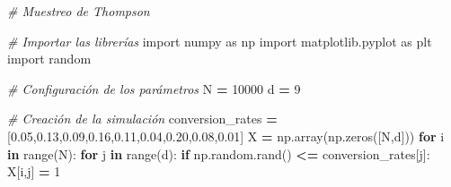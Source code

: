 \documentclass[]{book}
\newenvironment{Shaded}{\begin{snugshade}}{\end{snugshade}}
\newcommand{\BuiltInTok}[1]{#1}
\newcommand{\CommentTok}[1]{\textcolor[rgb]{0.56,0.35,0.01}{\textit{#1}}}
\newcommand{\ControlFlowTok}[1]{\textcolor[rgb]{0.13,0.29,0.53}{\textbf{#1}}}
\newcommand{\DecValTok}[1]{\textcolor[rgb]{0.00,0.00,0.81}{#1}}
\newcommand{\FloatTok}[1]{\textcolor[rgb]{0.00,0.00,0.81}{#1}}
\newcommand{\ImportTok}[1]{#1}
\newcommand{\KeywordTok}[1]{\textcolor[rgb]{0.13,0.29,0.53}{\textbf{#1}}}
\newcommand{\NormalTok}[1]{#1}
\newcommand{\OperatorTok}[1]{\textcolor[rgb]{0.81,0.36,0.00}{\textbf{#1}}}
\begin{document}
\begin{Shaded}
\begin{Highlighting}[]
\CommentTok{# Muestreo de Thompson}

\CommentTok{# Importar las librerías}
\ImportTok{import}\NormalTok{ numpy }\ImportTok{as}\NormalTok{ np}
\ImportTok{import}\NormalTok{ matplotlib.pyplot }\ImportTok{as}\NormalTok{ plt}
\ImportTok{import}\NormalTok{ random}

\CommentTok{# Configuración de los parámetros}
\NormalTok{N }\OperatorTok{=} \DecValTok{10000}
\NormalTok{d }\OperatorTok{=} \DecValTok{9}

\CommentTok{# Creación de la simulación}
\NormalTok{conversion_rates }\OperatorTok{=}\NormalTok{ [}\FloatTok{0.05}\NormalTok{,}\FloatTok{0.13}\NormalTok{,}\FloatTok{0.09}\NormalTok{,}\FloatTok{0.16}\NormalTok{,}\FloatTok{0.11}\NormalTok{,}\FloatTok{0.04}\NormalTok{,}\FloatTok{0.20}\NormalTok{,}\FloatTok{0.08}\NormalTok{,}\FloatTok{0.01}\NormalTok{]}
\NormalTok{X }\OperatorTok{=}\NormalTok{ np.array(np.zeros([N,d]))}
\ControlFlowTok{for}\NormalTok{ i }\KeywordTok{in} \BuiltInTok{range}\NormalTok{(N):}
    \ControlFlowTok{for}\NormalTok{ j }\KeywordTok{in} \BuiltInTok{range}\NormalTok{(d):}
        \ControlFlowTok{if}\NormalTok{ np.random.rand() }\OperatorTok{<=}\NormalTok{ conversion_rates[j]:}
\NormalTok{            X[i,j] }\OperatorTok{=} \DecValTok{1}


\end{Highlighting}
\end{Shaded}
\end{document}
